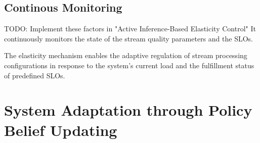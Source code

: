 \subsection{Continous Monitoring}

TODO: Implement these factors in "Active Inference-Based Elasticity Control"
It continuously monitors the state of the stream quality parameters and the SLOs. 

The elasticity mechanism enables the adaptive regulation of stream processing configurations in response to the system’s current load and the fulfillment status of predefined SLOs. 



\section{System Adaptation through Policy Belief Updating}